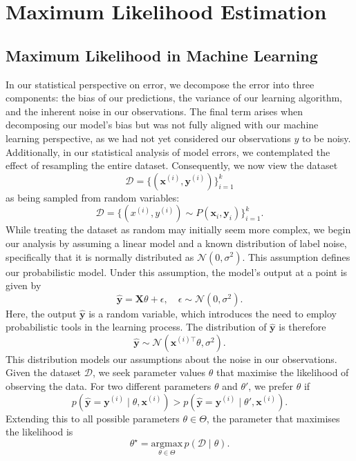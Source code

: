 \chapter{Maximum Likelihood Estimation}
\section{Maximum Likelihood in Machine Learning}

In our statistical perspective on error, we decompose the error into three components: the bias of our predictions, the variance of our learning algorithm, and the inherent noise in our observations. The final term arises when decomposing our model's bias but was not fully aligned with our machine learning perspective, as we had not yet considered our observations \( y \) to be noisy. Additionally, in our statistical analysis of model errors, we contemplated the effect of resampling the entire dataset. Consequently, we now view the dataset
\[
    \mathcal{D} = \{(\boldsymbol{x}^{(i)}, \boldsymbol{y}^{(i)})\}_{i=1}^{k}
\]
as being sampled from random variables:
\[
    \mathcal{D} = \{(x^{(i)}, y^{(i)}) \sim P(\mathbf{x}_i, \mathbf{y}_i)\}_{i=1}^{k}.
\]
While treating the dataset as random may initially seem more complex, we begin our analysis by assuming a linear model and a known distribution of label noise, specifically that it is normally distributed as \( \mathcal{N}(0, \sigma^2) \). This assumption defines our probabilistic model. Under this assumption, the model's output at a point is given by
\[
    \hat{\mathbf{y}} = \boldsymbol{X}\theta + \epsilon, \quad \epsilon \sim \mathcal{N}(0, \sigma^2).
\]
Here, the output \( \hat{\mathbf{y}} \) is a random variable, which introduces the need to employ probabilistic tools in the learning process. The distribution of \( \hat{\mathbf{y}} \) is therefore
\[
    \hat{\mathbf{y}} \sim \mathcal{N}(\boldsymbol{x}^{(i)\top}\theta, \sigma^2).
\]
This distribution models our assumptions about the noise in our observations. Given the dataset \( \mathcal{D} \), we seek parameter values \( \theta \) that maximise the likelihood of observing the data. For two different parameters \( \theta \) and \( \theta' \), we prefer \( \theta \) if
\[
    p(\hat{\mathbf{y}} = \boldsymbol{y}^{(i)} \mid \theta, \boldsymbol{x}^{(i)}) > p(\hat{\mathbf{y}} = \boldsymbol{y}^{(i)} \mid \theta', \boldsymbol{x}^{(i)}).
\]
Extending this to all possible parameters \( \theta \in \Theta \), the parameter that maximises the likelihood is
\[
    \theta^{\star} = \underset{\theta \in \Theta}{\mathrm{argmax}} \, p(\mathcal{D} \mid \theta).
\]
